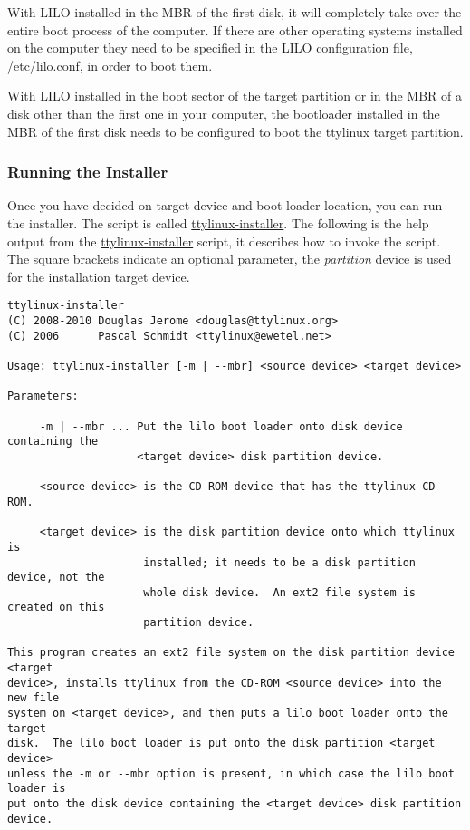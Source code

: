 \documentclass[10pt]{article}
\begin{document}
With LILO installed in the MBR of the first disk, it will completely take over
the entire boot process of the computer. If there are other operating systems
installed on the computer they need to be specified in the LILO configuration
file, \url{/etc/lilo.conf}, in order to boot them.

With LILO installed in the boot sector of the target partition or in the MBR of
a disk other than the first one in your computer, the bootloader installed in
the MBR of the first disk needs to be configured to boot the ttylinux target
partition.

\subsubsection{Running the Installer}

Once you have decided on target device and boot loader location, you can run
the installer. The script is called \url{ttylinux-installer}. The following is
the help output from the \url{ttylinux-installer} script, it describes how to
invoke the script. The square brackets indicate an optional parameter, the
{\it partition} device is used for the installation target device.

\begin{lstlisting}
ttylinux-installer
(C) 2008-2010 Douglas Jerome <douglas@ttylinux.org>
(C) 2006      Pascal Schmidt <ttylinux@ewetel.net>

Usage: ttylinux-installer [-m | --mbr] <source device> <target device>

Parameters:

     -m | --mbr ... Put the lilo boot loader onto disk device containing the
                    <target device> disk partition device.

     <source device> is the CD-ROM device that has the ttylinux CD-ROM.

     <target device> is the disk partition device onto which ttylinux is
                     installed; it needs to be a disk partition device, not the
                     whole disk device.  An ext2 file system is created on this
                     partition device.

This program creates an ext2 file system on the disk partition device <target
device>, installs ttylinux from the CD-ROM <source device> into the new file
system on <target device>, and then puts a lilo boot loader onto the target
disk.  The lilo boot loader is put onto the disk partition <target device>
unless the -m or --mbr option is present, in which case the lilo boot loader is
put onto the disk device containing the <target device> disk partition device.
\end{lstlisting}
\end{document}
